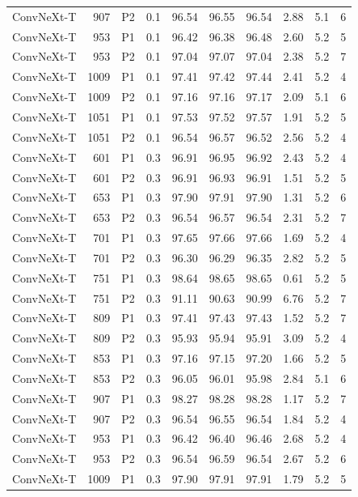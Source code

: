 {\begin{longtable}{lrllrrrrrr}
ConvNeXt-T & 907 & P2 & 0.1 & 96.54 & 96.55 & 96.54 & 2.88 & 5.1 & 6 \\
ConvNeXt-T & 953 & P1 & 0.1 & 96.42 & 96.38 & 96.48 & 2.60 & 5.2 & 5 \\
ConvNeXt-T & 953 & P2 & 0.1 & 97.04 & 97.07 & 97.04 & 2.38 & 5.2 & 7 \\
ConvNeXt-T & 1009 & P1 & 0.1 & 97.41 & 97.42 & 97.44 & 2.41 & 5.2 & 4 \\
ConvNeXt-T & 1009 & P2 & 0.1 & 97.16 & 97.16 & 97.17 & 2.09 & 5.1 & 6 \\
ConvNeXt-T & 1051 & P1 & 0.1 & 97.53 & 97.52 & 97.57 & 1.91 & 5.2 & 5 \\
ConvNeXt-T & 1051 & P2 & 0.1 & 96.54 & 96.57 & 96.52 & 2.56 & 5.2 & 4 \\
ConvNeXt-T & 601 & P1 & 0.3 & 96.91 & 96.95 & 96.92 & 2.43 & 5.2 & 4 \\
ConvNeXt-T & 601 & P2 & 0.3 & 96.91 & 96.93 & 96.91 & 1.51 & 5.2 & 5 \\
ConvNeXt-T & 653 & P1 & 0.3 & 97.90 & 97.91 & 97.90 & 1.31 & 5.2 & 6 \\
ConvNeXt-T & 653 & P2 & 0.3 & 96.54 & 96.57 & 96.54 & 2.31 & 5.2 & 7 \\
ConvNeXt-T & 701 & P1 & 0.3 & 97.65 & 97.66 & 97.66 & 1.69 & 5.2 & 4 \\
ConvNeXt-T & 701 & P2 & 0.3 & 96.30 & 96.29 & 96.35 & 2.82 & 5.2 & 5 \\
ConvNeXt-T & 751 & P1 & 0.3 & 98.64 & 98.65 & 98.65 & 0.61 & 5.2 & 5 \\
ConvNeXt-T & 751 & P2 & 0.3 & 91.11 & 90.63 & 90.99 & 6.76 & 5.2 & 7 \\
ConvNeXt-T & 809 & P1 & 0.3 & 97.41 & 97.43 & 97.43 & 1.52 & 5.2 & 7 \\
ConvNeXt-T & 809 & P2 & 0.3 & 95.93 & 95.94 & 95.91 & 3.09 & 5.2 & 4 \\
ConvNeXt-T & 853 & P1 & 0.3 & 97.16 & 97.15 & 97.20 & 1.66 & 5.2 & 5 \\
ConvNeXt-T & 853 & P2 & 0.3 & 96.05 & 96.01 & 95.98 & 2.84 & 5.1 & 6 \\
ConvNeXt-T & 907 & P1 & 0.3 & 98.27 & 98.28 & 98.28 & 1.17 & 5.2 & 7 \\
ConvNeXt-T & 907 & P2 & 0.3 & 96.54 & 96.55 & 96.54 & 1.84 & 5.2 & 4 \\
ConvNeXt-T & 953 & P1 & 0.3 & 96.42 & 96.40 & 96.46 & 2.68 & 5.2 & 4 \\
ConvNeXt-T & 953 & P2 & 0.3 & 96.54 & 96.59 & 96.54 & 2.67 & 5.2 & 6 \\
ConvNeXt-T & 1009 & P1 & 0.3 & 97.90 & 97.91 & 97.91 & 1.79 & 5.2 & 5 \\

\end{longtable}}

